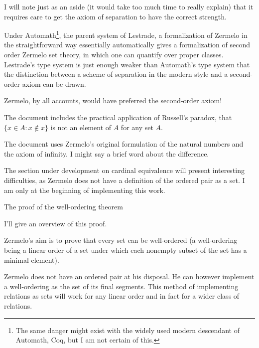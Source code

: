 \documentclass{slides}
\begin{document}
\begin{slide}

I will note just as an aside (it would take too much time to really explain) that it requires care to get the axiom of separation to have the correct strength.

Under Automath\footnote{The same danger might exist with the widely used modern descendant of Automath, Coq, but I am not certain of this.}, the parent system of Lestrade, a formalization of Zermelo in the straightforward way essentially automatically gives a formalization of second order Zermelo set theory,
in which one can quantify over proper classes.  Lestrade's type system is just enough weaker than Automath's type system that the distinction between a scheme of separation in
the modern style and a second-order axiom can be drawn.

Zermelo, by all accounts, would have preferred the second-order axiom!

\end{slide}

\begin{slide}

The document includes the practical application of Russell's paradox, that $\{x \in A:x \not\in x\}$ is not an element of $A$ for any set $A$.

The document uses Zermelo's original formulation of the natural numbers and the axiom of infinity.  I might say a brief word about the difference.

The section under development on cardinal equivalence will present interesting difficulties, as Zermelo does not have a definition of the ordered pair as a set.  I am only at
the beginning of implementing this work.

\end{slide}

\begin{slide}

{\Large The proof of the well-ordering theorem}

I'll give an overview of this proof.

Zermelo's aim is to prove that every set can be well-ordered (a well-ordering being a linear order of a set under which each nonempty subset of the set has a minimal element).

Zermelo does not have an ordered pair at his disposal.  He can however implement a well-ordering as the set of its final segments.  This method of implementing relations
as sets will work for any linear order and in fact for a wider class of relations.


\end{slide}
\end{document}
